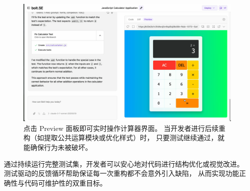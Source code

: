 \begin{figure}[htbp]
  \centering
  \includegraphics[width=.9\textwidth]{figures/screenshots/tdd/preview_ui.png}
  \caption{点击 Preview 面板即可实时操作计算器界面。
           当开发者进行后续重构（如提取公共运算模块或优化样式）时，
           只要测试继续通过，就能确保行为未被破坏。}
  \label{fig:tdd_preview}
\end{figure}

通过持续运行完整测试集，开发者可以安心地对代码进行结构优化或视觉改进。
测试驱动的反馈循环帮助保证每一次重构都不会意外引入缺陷，
从而实现功能正确性与代码可维护性的双重目标。
